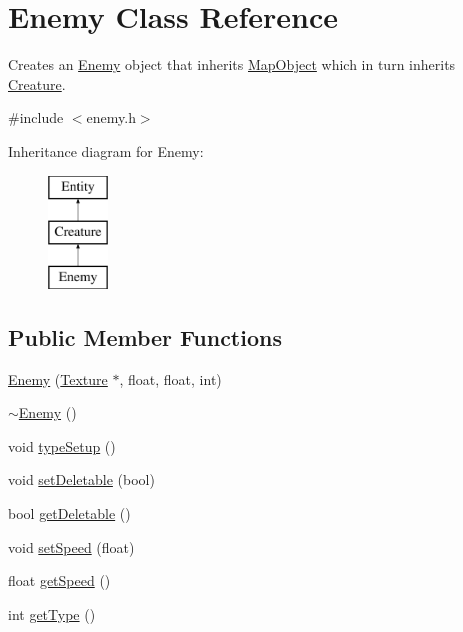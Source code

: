 \hypertarget{class_enemy}{\section{Enemy Class Reference}
\label{class_enemy}
}


Creates an \hyperlink{class_enemy}{Enemy} object that inherits \hyperlink{class_map_object}{Map\+Object} which in turn inherits \hyperlink{class_creature}{Creature}.  




{\ttfamily \#include $<$enemy.\+h$>$}

Inheritance diagram for Enemy\+:\begin{figure}[H]
\begin{center}
\leavevmode
\includegraphics[height=3.000000cm]{class_enemy}
\end{center}
\end{figure}
\subsection*{Public Member Functions}
\begin{DoxyCompactItemize}
\item 
\hyperlink{class_enemy_ae9cfc9f39bd776aaf87eee7346945dd4}{Enemy} (\hyperlink{class_texture}{Texture} $\ast$, float, float, int)
\item 
\hyperlink{class_enemy_ac0eec4755e28c02688065f9657150ac3}{$\sim$\+Enemy} ()
\item 
void \hyperlink{class_enemy_ac50fe15406592d81e276826425b3000b}{type\+Setup} ()
\item 
void \hyperlink{class_enemy_a0b3e1631733e464c755767b894ce3ef4}{set\+Deletable} (bool)
\item 
bool \hyperlink{class_enemy_a37e2cff8cfe21a2ce0245bca77fc84e2}{get\+Deletable} ()
\item 
void \hyperlink{class_enemy_a7185349825042de46d16bad7b1c422d6}{set\+Speed} (float)
\item 
float \hyperlink{class_enemy_acd43fc5766bf7ef886691244e1b66566}{get\+Speed} ()
\item 
int \hyperlink{class_enemy_a499c44284150d928f7fdf3a2d6e6e7ee}{get\+Type} ()
\end{DoxyCompactItemize}
